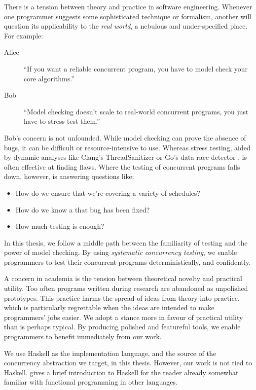 There is a tension between theory and practice in software
engineering.  Whenever one programmer suggests some sophisticated
technique or formalism, another will question its applicability to the
\emph{real world}, a nebulous and under-specified place.  For example:

\begin{description}
\item[Alice] ``If you want a reliable concurrent program, you have to
  model check your core algorithms.''
\item[Bob] ``Model checking doesn't scale to real-world concurrent
  programs, you just have to stress test them.''
\end{description}

Bob's concern is not unfounded.  While model checking can prove the
absence of bugs, it can be difficult or resource-intensive to use.
Whereas stress testing, aided by dynamic analyses like Clang's
ThreadSanitizer \parencite{serebryany2009} or Go's data race
detector \parencite{golang2017}, is often effective at finding flaws.  Where
the testing of concurrent programs falls down, however, is answering
questions like:

\begin{itemize}
\item How do we ensure that we're covering a variety of schedules?
\item How do we know a that bug has been fixed?
\item How much testing is enough?
\end{itemize}

In this thesis, we follow a middle path between the familiarity of
testing and the power of model checking.  By using \emph{systematic
  concurrency testing}, we enable programmers to test their concurrent
programs deterministically, and confidently.

A concern in academia is the tension between theoretical novelty and
practical utility.  Too often programs written during research are
abandoned as unpolished prototypes.  This practice harms the spread of
ideas from theory into practice, which is particularly regrettable
when the ideas are intended to make programmers' jobs easier.  We
adopt a stance more in favour of practical utility than is perhaps
typical.  By producing polished and featureful tools, we enable
programmers to benefit immediately from our work.

We use Haskell as the implementation language, and the source of the
concurrency abstraction we target, in this thesis.  However, our work
is not tied to Haskell.   gives a brief introduction
to Haskell for the reader already somewhat familiar with functional
programming in other languages.

